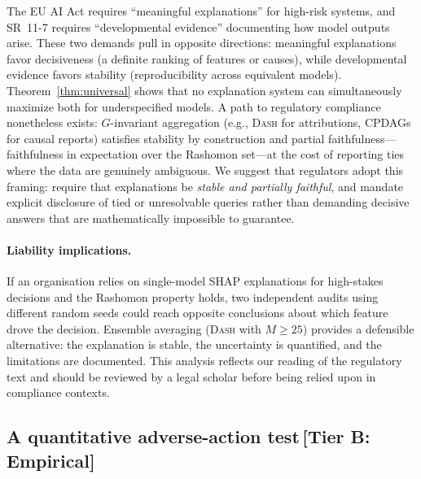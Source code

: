 \documentclass[11pt,a4paper]{article}
\newcommand{\DASH}{\textsc{Dash}}
\begin{document}
The EU AI Act \citep{euaiact2024} requires ``meaningful explanations'' for
high-risk systems, and SR~11-7 \citep{occ2011sr117} requires ``developmental
evidence'' documenting how model outputs arise.  These two demands pull in
opposite directions: meaningful explanations favor decisiveness (a definite
ranking of features or causes), while developmental evidence favors stability
(reproducibility across equivalent models).  Theorem~\ref{thm:universal} shows
that no explanation system can simultaneously maximize both for underspecified
models.  A path to regulatory compliance nonetheless exists: $G$-invariant
aggregation (e.g., \DASH{} for attributions, CPDAGs for causal reports)
satisfies stability by construction and partial faithfulness---faithfulness in
expectation over the Rashomon set---at the cost of reporting ties where the
data are genuinely ambiguous.  We suggest that regulators adopt this framing:
require that explanations be \emph{stable and partially faithful}, and mandate
explicit disclosure of tied or unresolvable queries rather than demanding
decisive answers that are mathematically impossible to guarantee.

\paragraph{Liability implications.}
If an organisation relies on single-model SHAP explanations for high-stakes decisions and the Rashomon property holds, two independent audits using different random seeds could reach opposite conclusions about which feature drove the decision. Ensemble averaging (\DASH{} with $M \geq 25$) provides a defensible alternative: the explanation is stable, the uncertainty is quantified, and the limitations are documented. This analysis reflects our reading of the regulatory text and should be reviewed by a legal scholar before being relied upon in compliance contexts.

\subsection{A quantitative adverse-action test\,\textnormal{\normalsize[Tier B: Empirical]}}
\label{sec:adverse-action}
\end{document}
